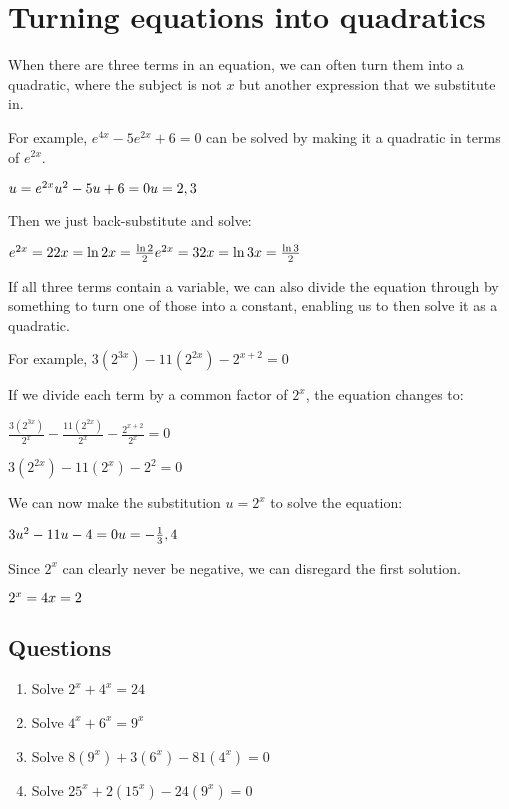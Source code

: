 \documentclass[../main.tex]{subfiles}
\begin{document}
\section{Turning equations into quadratics}
When there are three terms in an equation, we can often turn them into a quadratic, where the subject is not \(x\) but another expression that we substitute in.

For example, \(e^{4x}-5e^{2x}+6=0\) can be solved by making it a quadratic in terms of \(e^{2x}\).

\(u=e^{2x}\\
u^2-5u+6=0\\
u=2, 3\)

Then we just back-substitute and solve:

\(
e^{2x}=2     \\      
2x=\ln{2}      \\ 
x=\frac{\ln{2}}{2}\\     
e^{2x}=3\\
2x=\ln{3}\\
x=\frac{\ln{3}}{2}
\)

If all three terms contain a variable, we can also divide the equation through by something to turn one of those into a constant, enabling us to then solve it as a quadratic.

For example, \(3(2^{3x})-11(2^{2x})-2^{x+2}=0\)

If we divide each term by a common factor of \(2^x\), the equation changes to:

\(\frac{3(2^{3x})}{2^x}-\frac{11(2^{2x})}{2^x}-\frac{2^{x+2}}{2^x}=0\)

\(3(2^{2x})-11(2^x)-2^2=0\)

We can now make the substitution \(u=2^x\) to solve the equation:

\(3u^2-11u-4=0\\
u=-\frac{1}{3}, 4\)

Since \(2^x\) can clearly never be negative, we can disregard the first solution.

\(2^x=4\\
x=2\)\\

\pagebreak

\subsection*{Questions}
\label{quadratics}
\begin{enumerate}
    \item Solve \(2^x+4^x=24\)
    
    \item Solve \(4^x+6^x=9^x\)
    
    \item Solve \(8(9^x)+3(6^x)-81(4^x)=0\)
    
    \item Solve \(25^x+2(15^x)-24(9^x)=0\)
\end{enumerate}
\end{document}
